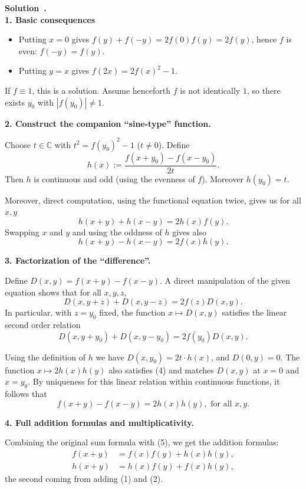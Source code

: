 \documentclass[a4paper,12pt]{article}
\newenvironment{solution}[1][]{%
  \goodbreak\smallskip\par\noindent\textbf{Solution\if\relax\detokenize{#1}\relax\else~#1\fi.}~}%
{%
  \goodbreak
}
\begin{document}
\begin{solution}
    \\
    \textbf{1. Basic consequences}
    \begin{itemize}
        \item Putting $x=0$ gives $f(y)+f(-y)=2f(0)f(y)=2f(y)$, hence $f$ is even: $f(-y)=f(y)$.
        \item Putting $y=x$ gives $f(2x)=2f(x)^2-1$.
    \end{itemize}

    If $f\equiv 1$, this is a solution. Assume henceforth $f$ is not identically $1$, so there exists $y_0$ with $|f(y_0)|\neq 1$.

    \textbf{2. Construct the companion ``sine-type'' function.}

    Choose $t\in\mathbb{C}$ with $t^2=f(y_0)^2-1$ ($t\neq 0$). Define
    \[h(x) := \frac{f(x+y_0) - f(x-y_0)}{2t}.\]
    Then $h$ is continuous and odd (using the evenness of $f$). Moreover $h(y_0)=t$.

    Moreover, direct computation, using the functional equation twice,
    gives us for all $x,y$
    \[h(x+y) + h(x-y) = 2h(x)f(y). \tag{1}\]
    Swapping $x$ and $y$ and using the oddness of $h$ gives also
    \[h(x+y) - h(x-y) = 2f(x)h(y). \tag{2}\]

    \textbf{3. Factorization of the ``difference''.}

    Define $D(x,y)=f(x+y)-f(x-y)$. A direct manipulation of the given equation shows that for all $x,y,z$,
    \[D(x,y+z)+D(x,y-z) = 2f(z)D(x,y). \tag{3}\]
    In particular, with $z=y_0$ fixed, the function $x\mapsto D(x,y)$ satisfies the linear second order relation
    \[D(x,y+y_0)+D(x,y-y_0)=2f(y_0)D(x,y). \tag{4}\]

    Using the definition of $h$ we have $D(x,y_0)=2t\cdot h(x)$, and $D(0,y)=0$. The function $x\mapsto 2h(x)h(y)$ also satisfies (4) and matches $D(x,y)$ at $x=0$ and $x=y_0$. By uniqueness for this linear relation within continuous functions, it follows that
    \[f(x+y) - f(x-y) = 2h(x)h(y), \text{ for all } x,y. \tag{5}\]

    \textbf{4. Full addition formulas and multiplicativity.}

    Combining the original sum formula with (5), we get the addition formulas:
    \begin{align*}
        f(x+y) &= f(x)f(y) + h(x)h(y),\\
        h(x+y) &= h(x)f(y) + f(x)h(y),
    \end{align*}
    the second coming from adding (1) and (2).


\end{solution}
\end{document}
